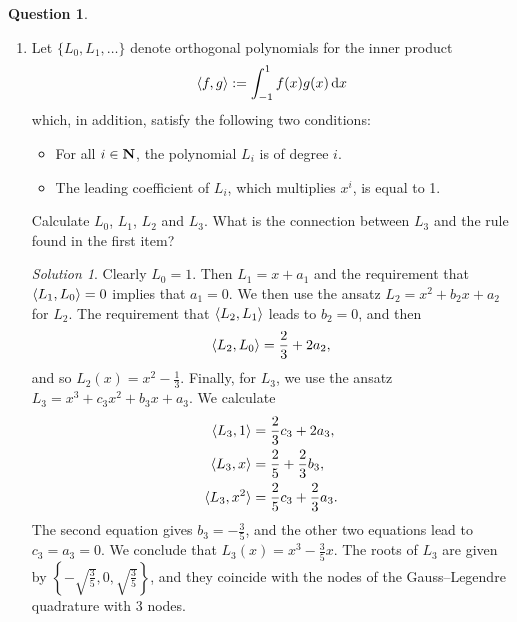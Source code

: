 \documentclass[11pt]{article}
\theoremstyle{definition}
\newtheorem{question}{Question}
\theoremstyle{remark}
\newtheorem*{protosolution}{Solution}
\newenvironment{solutionframe}
{%
    \begin{mdframed}[
        leftmargin=1cm,
        skipabove=.3cm,
        linecolor=blue,
        backgroundcolor=lightgreen,
        linewidth=0pt,
        innerleftmargin=.5em,
        innerrightmargin=.5em,
        innertopmargin=.3em,
        innerbottommargin=.6em,
    ]
}
{
    \end{mdframed}
}
\newenvironment{solution}
{\pushQED{\qed}\renewcommand{\qedsymbol}{$\triangle$}
\begin{solutionframe}\small \begin{protosolution}}
{\popQED\end{protosolution}\end{solutionframe}}
\begin{document}
\begin{question}
\begin{enumerate}
        \item
            Let $\{L_0, L_1, \dotsc\}$ denote orthogonal polynomials for the inner product
            \[
                \langle f, g\rangle := \int_{-1}^{1} f(x) g(x) \, \mathrm d x
            \]
            which, in addition, satisfy the following two conditions:
            \begin{itemize}
                \item
                    For all $i \in \mathbf N$,
                    the polynomial $L_i$ is of degree $i$.

                \item
                    The leading coefficient of $L_i$,
                    which multiplies $x^i$,
                    is equal to 1.
            \end{itemize}
            Calculate $L_0$, $L_1$, $L_2$ and $L_3$.
            What is the connection between $L_3$ and the rule found in the first item?

            \begin{solution}
                Clearly $L_0 = 1$.
                Then $L_1 = x + a_1$ and the requirement that $\langle L_1, L_0\rangle = 0$ implies that $a_1 = 0$.
                We then use the ansatz $L_2 = x^2 + b_2 x + a_2$ for $L_2$.
                The requirement that $\langle L_2, L_1\rangle$ leads to $b_2 = 0$, and then
                \[
                    \langle L_2, L_0\rangle = \frac{2}{3} + 2 a_2,
                \]
                and so $L_2(x) = x^2 - \frac{1}{3}$.
                Finally, for $L_3$, we use the ansatz $L_3 = x^3 + c_3 x^2 + b_3 x + a_3$.
                We calculate
                \begin{align*}
                    \langle L_3, 1\rangle &= \frac{2}{3} c_3 + 2 a_3, \\
                    \langle L_3, x\rangle &= \frac{2}{5} + \frac{2}{3} b_3, \\
                    \langle L_3, x^2\rangle &= \frac{2}{5} c_3 + \frac{2}{3} a_3.
                \end{align*}
                The second equation gives $b_3 = - \frac{3}{5}$,
                and the other two equations lead to $c_3 = a_3 = 0$.
                We conclude that $L_3(x) = x^3 - \frac{3}{5}  x$.
                The roots of $L_3$ are given by $\left\{- \sqrt{\frac{3}{5}}, 0, \sqrt{\frac{3}{5}} \right\}$,
                and they coincide with the nodes of the Gauss--Legendre quadrature with 3 nodes.
            \end{solution}


\end{enumerate}
\end{question}
\end{document}
